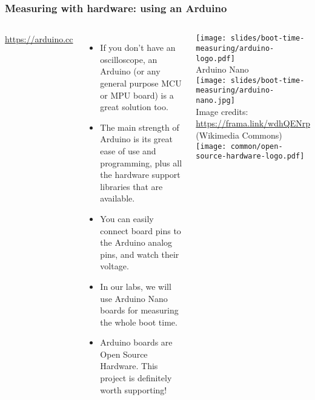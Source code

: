 \begin{frame}
\frametitle{Measuring with hardware: using an Arduino}
\begin{columns}
  \url{https://arduino.cc}
  \begin{itemize}
  \item If you don't have an oscilloscope, an Arduino (or any general
        purpose MCU or MPU board) is a great solution too.
  \item The main strength of Arduino is its great ease of use and
        programming, plus all the hardware support libraries that are available.
  \item You can easily connect board pins to the Arduino analog pins, and
        watch their voltage.
  \item In our labs, we will use Arduino Nano boards for measuring the
        whole boot time.
  \item Arduino boards are Open Source Hardware. This project is
      definitely worth supporting!
  \end{itemize}
  \begin{center}
  \tiny
  \texttt{[image: slides/boot-time-measuring/arduino-logo.pdf]}\\
  \vspace{1cm}
  Arduino Nano\\
  \texttt{[image: slides/boot-time-measuring/arduino-nano.jpg]}\\
  Image credits: \url{https://frama.link/wdhQENrp} (Wikimedia Commons)\\
  \vspace{1cm}
  \texttt{[image: common/open-source-hardware-logo.pdf]}
  \end{center}
\end{columns}
\end{frame}

